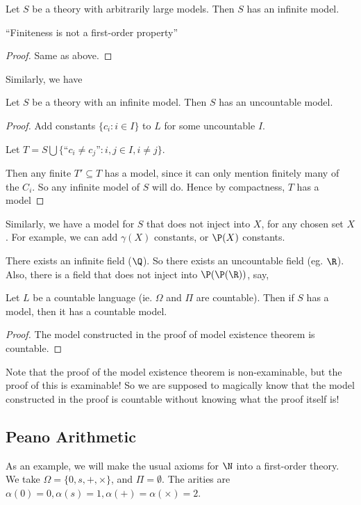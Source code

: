 \documentclass[a4paper]{article}
\begin{document}
\begin{cor}
  Let $S$ be a theory with arbitrarily large models. Then $S$ has an infinite model.

  ``Finiteness is not a first-order property''
\end{cor}

\begin{proof}
  Same as above.
\end{proof}

Similarly, we have
\begin{cor}
  Let $S$ be a theory with an infinite model. Then $S$ has an uncountable model.
\end{cor}

\begin{proof}
  Add constants $\{c_i: i\in I\}$ to $L$ for some uncountable $I$.

  Let $T = S\bigcup\{\text{``}c_i \not= c_j\text{''}: i, j\in I, i \not = j\}$.

  Then any finite $T' \subseteq T$ has a model, since it can only mention finitely many of the $C_i$. So any infinite model of $S$ will do. Hence by compactness, $T$ has a model
\end{proof}
Similarly, we have a model for $S$ that does not inject into $X$, for any chosen set $X$. For example, we can add $\gamma(X)$ constants, or $\P(X)$ constants.

\begin{eg}
  There exists an infinite field ($\Q$). So there exists an uncountable field (eg. $\R$). Also, there is a field that does not inject into $\P(\P(\R))$, say,
\end{eg}

\begin{thm}
  Let $L$ be a countable language (ie. $\Omega$ and $\Pi$ are countable). Then if $S$ has a model, then it has a countable model.
\end{thm}

\begin{proof}
  The model constructed in the proof of model existence theorem is countable.
\end{proof}
Note that the proof of the model existence theorem is non-examinable, but the proof of this is examinable! So we are supposed to magically know that the model constructed in the proof is countable without knowing what the proof itself is!

\subsection{Peano Arithmetic}
As an example, we will make the usual axioms for $\N$ into a first-order theory. We take $\Omega = \{0, s, +, \times\}$, and $\Pi = \emptyset$. The arities are $\alpha(0) = 0, \alpha(s) = 1, \alpha(+) = \alpha(\times) = 2$.
\end{document}
